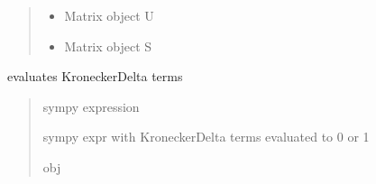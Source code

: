 \documentclass[letterpaper,10pt,english]{sphinxmanual}
\begin{document}
\begin{fulllineitems}
\begin{fulllineitems}
\begin{quote}
\begin{description}
\sphinxAtStartPar
\begin{itemize}
\item {} 
\sphinxAtStartPar
{} \textendash{} Matrix object U

\item {} 
\sphinxAtStartPar
{} \textendash{} Matrix object S

\end{itemize}


\end{description}\end{quote}

\end{fulllineitems}


\begin{fulllineitems}
\label{\detokenize{src.sensitivity.sensitivity_tools:src.sensitivity.sensitivity_tools.SensitivityMatrix.resolve_kronecker}}
\pysigstartsignatures
\pysiglinewithargsret
{}
{}
{}
\pysigstopsignatures
\sphinxAtStartPar
evaluates KroneckerDelta terms
\begin{quote}\begin{description}
\sphinxAtStartPar
{} \textendash{} sympy expression

\sphinxAtStartPar
sympy expr with KroneckerDelta terms evaluated to 0 or 1

\sphinxAtStartPar
obj

\end{description}\end{quote}

\end{fulllineitems}



\end{fulllineitems}
\end{document}
